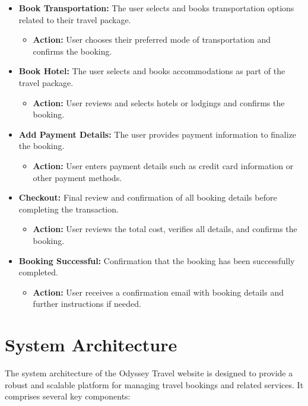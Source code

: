 \documentclass{scrreprt}
\begin{document}
\begin{itemize}
    \item \textbf{Book Transportation:} The user selects and books transportation options related to their travel package.
    \begin{itemize}
        \item \textbf{Action:} User chooses their preferred mode of transportation and confirms the booking.
    \end{itemize}
    
    \item \textbf{Book Hotel:} The user selects and books accommodations as part of the travel package.
    \begin{itemize}
        \item \textbf{Action:} User reviews and selects hotels or lodgings and confirms the booking.
    \end{itemize}
    
    \item \textbf{Add Payment Details:} The user provides payment information to finalize the booking.
    \begin{itemize}
        \item \textbf{Action:} User enters payment details such as credit card information or other payment methods.
    \end{itemize}
    
    \item \textbf{Checkout:} Final review and confirmation of all booking details before completing the transaction.
    \begin{itemize}
        \item \textbf{Action:} User reviews the total cost, verifies all details, and confirms the booking.
    \end{itemize}
    
    \item \textbf{Booking Successful:} Confirmation that the booking has been successfully completed.
    \begin{itemize}
        \item \textbf{Action:} User receives a confirmation email with booking details and further instructions if needed.
    \end{itemize}
\end{itemize}

\chapter{System Architecture}
The system architecture of the Odyssey Travel website is designed to provide a robust and scalable platform for managing travel bookings and related services. It comprises several key components:
\end{document}
